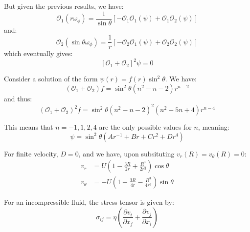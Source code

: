\documentclass[12pt]{article}
\begin{document}
But given the previous results, we have:
\begin{equation}
    \mathcal{O}_{1}(r\omega_{\phi}) = \frac{1}{\sin{\theta}} \left[ -\mathcal{O}_{1} \mathcal{O}_{1}(\psi) + \mathcal{O}_{1} \mathcal{O}_{2}(\psi) \right]
\end{equation}
and:
\begin{equation}
    \mathcal{O}_{2}(\sin{\theta}\omega_{\phi}) = \frac{1}{r} \left[ -\mathcal{O}_{2} \mathcal{O}_{1}(\psi) + \mathcal{O}_{2} \mathcal{O}_{2}(\psi) \right]
\end{equation}
which eventually gives:
\begin{equation}
    \left[ \mathcal{O}_{1} + \mathcal{O}_{2} \right]^2 \psi = 0
\end{equation}

Consider a solution of the form $\psi(r) = f(r) \sin^{2}{\theta}$. We have:
\begin{equation}
    (\mathcal{O}_{1} + \mathcal{O}_{2}) f = \sin^{2}{\theta} (n^{2} - n - 2) r^{n-2}
\end{equation}
and thus:
\begin{equation}
    (\mathcal{O}_{1} + \mathcal{O}_{2})^{2} f = \sin^{2}{\theta} (n^{2} - n - 2)^{2} (n^{2} - 5n + 4) r^{n-4}
\end{equation}

This means that $n = -1, 1, 2, 4$ are the only possible values for $n$, meaning:
\begin{equation}
    \psi = \sin^{2}{\theta} \left( A r^{-1} + B r + C r^{2} + D r^{4} \right)
\end{equation}

For finite velocity, $D = 0$, and we have, upon subsituting $v_{r}(R) = v_{\theta}(R) = 0$:
\begin{equation}
    \begin{split}
        v_{r} &= U \left( 1 - \frac{3R}{2r} + \frac{R^{3}}{2r^{3}} \right) \cos{\theta} \\
        v_{\theta} &= -U \left( 1 - \frac{3R}{4r} - \frac{R^{3}}{4r^{3}} \right) \sin{\theta}
    \end{split}
\end{equation}

For an incompressible fluid, the stress tensor is given by:
\begin{equation}
    \sigma_{ij} = \eta \left( \frac{\partial v_{i}}{\partial x_{j}} + \frac{\partial v_{j}}{\partial x_{i}} \right)
\end{equation}
\end{document}
